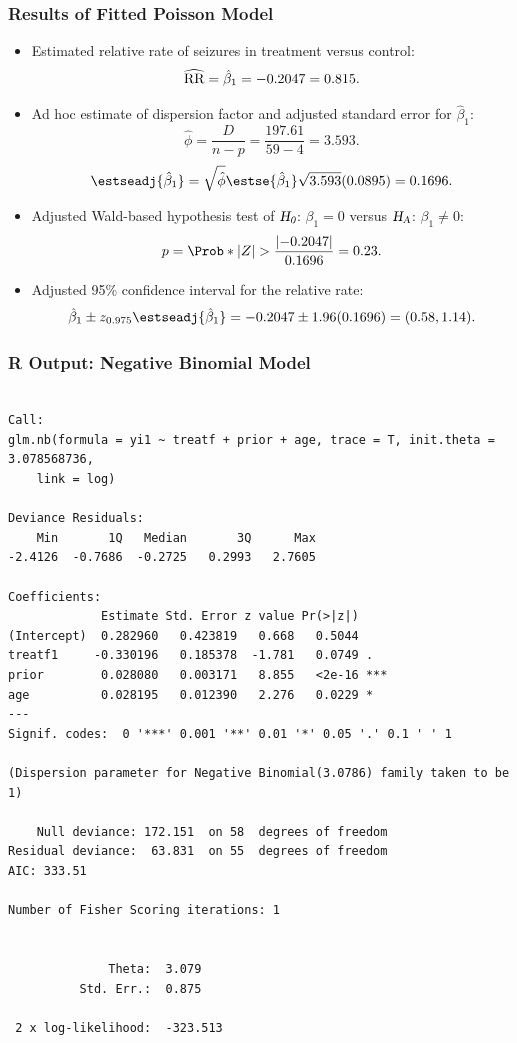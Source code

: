 \documentclass[oneside]{book}\usepackage[]{graphicx}\usepackage[svgnames]{xcolor}
\makeatletter
\newenvironment{kframe}{%
 \def\at@end@of@kframe{}%
 \ifinner\ifhmode%
  \def\at@end@of@kframe{\end{minipage}}%
  \begin{minipage}{\columnwidth}%
 \fi\fi%
 \def\FrameCommand##1{\hskip\@totalleftmargin \hskip-\fboxsep
 \colorbox{shadecolor}{##1}\hskip-\fboxsep
     \hskip-\linewidth \hskip-\@totalleftmargin \hskip\columnwidth}%
 \MakeFramed {\advance\hsize-\width
   \@totalleftmargin\z@ \linewidth\hsize
   \@setminipage}}%
 {\par\unskip\endMakeFramed%
 \at@end@of@kframe}
\newenvironment{knitrout}{}{} %
\let\exp\relax%
\newcommand{\HN}{\textsl{H}_{\textsl{0}}}%
\newcommand{\HA}{\textsl{H}_{\textsl{A}}}%
\newcommand{\RR}{\text{RR}}%
\DeclarePairedDelimiter\abs{\lvert}{\rvert}
\makeatother
\begin{document}
\subsubsection*{Results of Fitted Poisson Model}
\begin{itemize}
      \item Estimated relative rate of seizures in treatment versus control:
            \[ \widehat{\RR}=\exp{\hat{\beta}_1}=\exp{-0.2047}=0.815. \]
      \item Ad hoc estimate of dispersion factor and adjusted standard error for $ \hat{\beta}_1 $:
            \[ \hat{\phi}=\frac{D}{n-p}=\frac{197.61}{59-4}=3.593. \]
            \[ \estseadj{\hat{\beta}_1}=\sqrt{\hat{\phi}}\estse{\hat{\beta}_1}\sqrt{3.593}(0.0895)=0.1696. \]
      \item Adjusted Wald-based hypothesis test of $ \HN $: $ \beta_1=0 $ versus $ \HA $: $ \beta_1\ne 0 $:
            \[ p=\Prob*{\abs{Z}>\frac{\abs{-0.2047}}{0.1696}}=0.23. \]
      \item Adjusted 95\% confidence interval for the relative rate:
            \[ \exp{\hat{\beta}_1\pm z_{0.975}\estseadj{\hat{\beta}_1}}=\exp{-0.2047\pm 1.96(0.1696)}=(0.58,1.14). \]
\end{itemize}
\subsubsection*{R Output: Negative Binomial Model}
\begin{knitrout}
\color{fgcolor}\begin{kframe}
\begin{verbatim}

Call:
glm.nb(formula = yi1 ~ treatf + prior + age, trace = T, init.theta = 3.078568736, 
    link = log)

Deviance Residuals: 
    Min       1Q   Median       3Q      Max  
-2.4126  -0.7686  -0.2725   0.2993   2.7605  

Coefficients:
             Estimate Std. Error z value Pr(>|z|)    
(Intercept)  0.282960   0.423819   0.668   0.5044    
treatf1     -0.330196   0.185378  -1.781   0.0749 .  
prior        0.028080   0.003171   8.855   <2e-16 ***
age          0.028195   0.012390   2.276   0.0229 *  
---
Signif. codes:  0 '***' 0.001 '**' 0.01 '*' 0.05 '.' 0.1 ' ' 1

(Dispersion parameter for Negative Binomial(3.0786) family taken to be 1)

    Null deviance: 172.151  on 58  degrees of freedom
Residual deviance:  63.831  on 55  degrees of freedom
AIC: 333.51

Number of Fisher Scoring iterations: 1


              Theta:  3.079 
          Std. Err.:  0.875 

 2 x log-likelihood:  -323.513 
\end{verbatim}
\end{kframe}
\end{knitrout}
\end{document}
